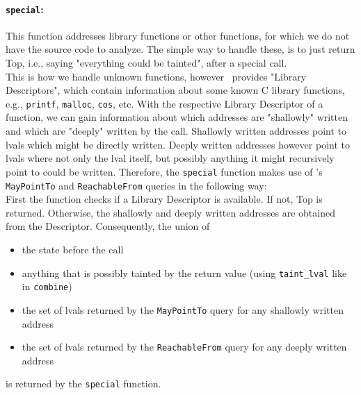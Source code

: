           \paragraph{\texttt{special}:} This function addresses library functions or other functions, for which we do not have the source code to analyze. The simple way to handle these, is to just return Top, i.e., saying "everything could be tainted", after a special call.\\
          This is how we handle unknown functions, however \gob\ provides "Library Descriptors", which contain information about some known C library functions, e.g., \texttt{printf}, \texttt{malloc}, \texttt{cos}, etc. With the respective Library Descriptor of a function, we can gain information about which addresses are "shallowly" written and which are "deeply" written by the call. Shallowly written addresses point to \ac{lval}s which might be directly written. Deeply written addresses however point to \ac{lval}s where not only the \ac{lval} itself, but possibly anything it might recursively point to could be written. Therefore, the \texttt{special} function makes use of \gob's \texttt{MayPointTo} and \texttt{ReachableFrom} queries in the following way:\\
          First the function checks if a Library Descriptor is available. If not, Top is returned. Otherwise, the shallowly and deeply written addresses are obtained from the Descriptor. Consequently, the union of 
          \begin{itemize}
            \item the state before the call
            \item anything that is possibly tainted by the return value (using \texttt{taint\_lval} like in \texttt{combine}) 
            \item the set of \ac{lval}s returned by the \texttt{MayPointTo} query for any shallowly written address
            \item the set of \ac{lval}s returned by the \texttt{ReachableFrom} query for any deeply written address
          \end{itemize}
          is returned by the \texttt{special} function.

